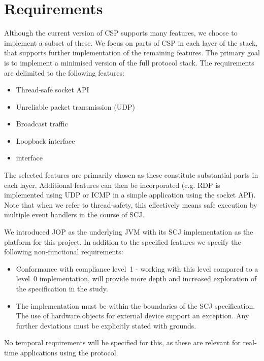 \section{Requirements}
Although the current version of CSP supports many features, we choose to implement a subset of these. We focus on parts of CSP in each layer of the stack, that supports further implementation of the remaining features. The primary goal is to implement a minimised version of the full protocol stack. The requirements are delimited to the following features:

\begin{itemize}
	\item Thread-safe socket API
	\item Unreliable packet transmission (UDP)
	\item Broadcast traffic
	\item Loopback interface
	\item \iic interface
\end{itemize}

The selected features are primarily chosen as these constitute substantial parts in each layer. Additional features can then be incorporated (e.g. RDP is implemented using UDP or ICMP in a simple application using the socket API).
Note that when we refer to thread-safety, this effectively means safe execution by multiple event handlers in the course of SCJ.

We introduced JOP as the underlying JVM with its SCJ implementation as the platform for this project. In addition to the specified features we specify the following non-functional requirements:

\begin{itemize}
	\item Conformance with compliance level~1 - working with this level compared to a level~0 implementation, will provide more depth and increased exploration of the specification in the study.
	\item The implementation must be within the boundaries of the SCJ specification. The use of hardware objects for external device support an exception. Any further deviations must be explicitly stated with grounds.
\end{itemize}

No temporal requirements will be specified for this, as these are relevant for real-time applications using the protocol.